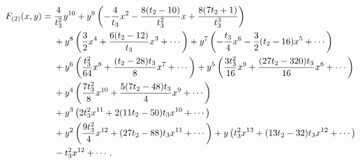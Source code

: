 \begin{align}
    \label{curve:potts_mixed}
    F_{(2)}(x,y)={} & \frac{4}{t_3^2}y^{10}
    +y^9\left(-\frac{4}{t_3}x^2-\frac{8(t_2-10)}{t_3^2}x
    +\frac{8(7t_2+1)}{t_3^3}\right)\notag \\*
                    & {}+y^8\left(\frac{3}{2}x^4+\frac{6(t_2-12)}{t_3}x^3+\cdots\right)
    +y^7\left(-\frac{t_3}{4}x^6-\frac{3}{2}(t_2-16)x^5+\cdots\right)\notag \\*
                    & {}+y^6\left(\frac{t_3^2}{64}x^8+\frac{(t_2-28)t_3}{8}x^7+\cdots\right)
    +y^5\left(\frac{3t_3^2}{16}x^9+\frac{(27t_2-320)t_3}{16}x^8+\cdots\right)\notag \\*
                    & {}+y^4\left(\frac{7t_3^2}{8}x^{10}+\frac{5(7t_2-48)t_3}{4}x^9+\cdots\right)\notag \\*
                    & {}+y^3\left(2t_3^2x^{11}+2(11t_2-50)t_3x^{10}+\cdots\right)\notag \\*
                    & {}+y^2\left(\frac{9t_3^2}{4}x^{12}+(27t_2-88)t_3x^{11}+\cdots\right)
    +y\left(t_3^2x^{13}+(13t_2-32)t_3x^{12}+\cdots\right)\notag \\*
                    & {}-t_3^2x^{12}+\cdots.
\end{align}
